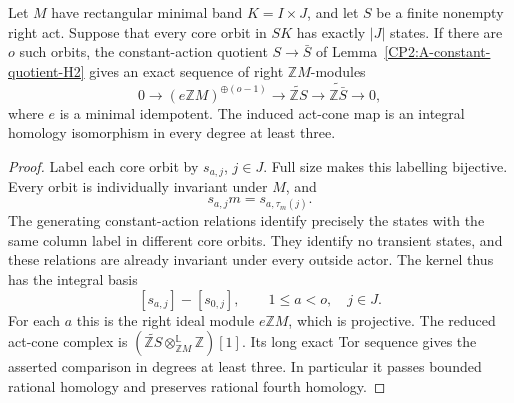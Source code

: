 \begin{lemma}
\label{CP2:A-full-column-act-kernel}
Let $M$ have rectangular minimal band $K=I\times J$, and let
$S$ be a finite nonempty right act. Suppose that every core
orbit in $SK$ has exactly $|J|$ states. If there are $o$ such
orbits, the constant-action quotient $S\to\bar S$ of
Lemma~\ref{CP2:A-constant-quotient-H2} gives an exact sequence
of right $\mathbb ZM$-modules
\[
 0\longrightarrow(e\mathbb ZM)^{\oplus(o-1)}
 \longrightarrow\widetilde{\mathbb ZS}
 \longrightarrow\widetilde{\mathbb Z\bar S}
 \longrightarrow0,
\]
where $e$ is a minimal idempotent. The induced act-cone map is
an integral homology isomorphism in every degree at least three.
\end{lemma}
\begin{proof}
Label each core orbit by $s_{a,j}$, $j\in J$. Full size makes
this labelling bijective. Every orbit is individually invariant
under $M$, and
\[
 s_{a,j}m=s_{a,\tau_m(j)}.
\]
The generating constant-action relations identify precisely
the states with the same column label in different core orbits.
They identify no transient states, and these relations are
already invariant under every outside actor. The kernel thus
has the integral basis
\[
 [s_{a,j}]-[s_{0,j}],\qquad 1\leq a<o,\quad j\in J.
\]
For each $a$ this is the right ideal module $e\mathbb ZM$,
which is projective. The reduced act-cone complex is
$(\widetilde{\mathbb ZS}\otimes_{\mathbb ZM}^{\mathbb L}
\mathbb Z)[1]$. Its long exact Tor sequence gives the asserted
comparison in degrees at least three. In particular it passes
bounded rational homology and preserves rational fourth homology.
\end{proof}

